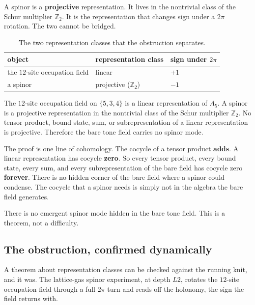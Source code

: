 A spinor is a \textbf{projective} representation. It lives in the nontrivial class of the Schur multiplier
$\mathbb{Z}_2$. It is the representation that changes sign under a $2\pi$ rotation. The two cannot be bridged.

\begin{table}[ht]
\centering
\begin{tabular}{@{}lll@{}}
\toprule
object & representation class & sign under $2\pi$ \\
\midrule
the $12$-site occupation field & linear & $+1$ \\
a spinor & projective ($\mathbb{Z}_2$) & $-1$ \\
\bottomrule
\end{tabular}
\caption{The two representation classes that the obstruction separates.}
\label{tab:534-rep-class}
\end{table}

\begin{theorem}
The $12$-site occupation field on $\{5,3,4\}$ is a linear representation of $A_5$. A spinor is a projective
representation in the nontrivial class of the Schur multiplier $\mathbb{Z}_2$. No tensor product, bound state,
sum, or subrepresentation of a linear representation is projective. Therefore the bare tone field carries no
spinor mode.
\end{theorem}

The proof is one line of cohomology. The cocycle of a tensor product \textbf{adds}. A linear representation has
cocycle \textbf{zero}. So every tensor product, every bound state, every sum, and every subrepresentation of the
bare field has cocycle zero \textbf{forever}. There is no hidden corner of the bare field where a spinor could
condense. The cocycle that a spinor needs is simply not in the algebra the bare field generates.

\begin{principle}
There is no emergent spinor mode hidden in the bare tone field. This is a theorem, not a difficulty.
\end{principle}

\subsection{The obstruction, confirmed dynamically}

A theorem about representation classes can be checked against the running knit, and it was. The lattice-gas
spinor experiment, at depth $L2$, rotates the $12$-site occupation field through a full $2\pi$ turn and reads
off the holonomy, the sign the field returns with.

